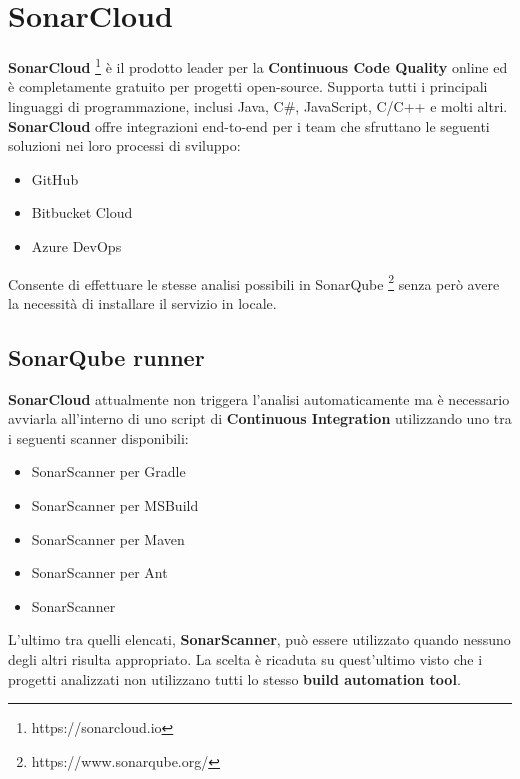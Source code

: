 \section{SonarCloud}\label{sonar}
\textbf{SonarCloud} \footnote{https://sonarcloud.io} è il prodotto leader per la \textbf{Continuous Code Quality} online ed è completamente gratuito per progetti open-source. Supporta tutti i principali linguaggi di programmazione, inclusi Java, C\#, JavaScript, C/C++ e molti altri. \textbf{SonarCloud} offre integrazioni end-to-end per i team che sfruttano le seguenti soluzioni nei loro processi di sviluppo:
\begin{itemize}
	\item GitHub
	\item Bitbucket Cloud
	\item Azure DevOps
\end{itemize}
Consente di effettuare le stesse analisi possibili in SonarQube \footnote{https://www.sonarqube.org/} senza però avere la necessità di installare il servizio in locale.
\subsection{SonarQube runner}
\textbf{SonarCloud} attualmente non triggera l'analisi automaticamente ma è necessario avviarla all'interno di uno script di \textbf{Continuous Integration} utilizzando uno tra i seguenti scanner disponibili:
\begin{itemize}
	\item SonarScanner per Gradle
	\item SonarScanner per MSBuild
	\item SonarScanner per Maven
	\item SonarScanner per Ant
	\item SonarScanner	
\end{itemize}
L'ultimo tra quelli elencati, \textbf{SonarScanner}, può essere utilizzato quando nessuno degli altri risulta appropriato. La scelta è ricaduta su quest'ultimo visto che i progetti analizzati non utilizzano tutti lo stesso \textbf{build automation tool}. 
